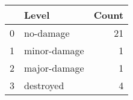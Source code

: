 \begin{tabular}{llr}
\toprule
 & Level & Count \\
\midrule
0 & no-damage & 21 \\
1 & minor-damage & 1 \\
2 & major-damage & 1 \\
3 & destroyed & 4 \\
\bottomrule
\end{tabular}
